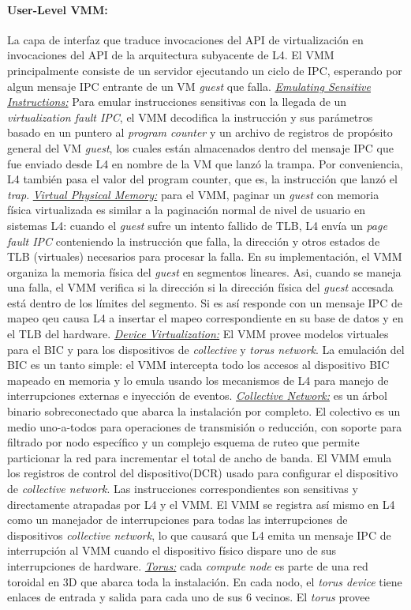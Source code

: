 \paragraph{\textnormal{\textbf{User-Level VMM:}}}
La capa de interfaz que traduce invocaciones del API de virtualización en invocaciones del API de la arquitectura subyacente de L4. El VMM principalmente consiste de un servidor ejecutando un ciclo de IPC, esperando por algun mensaje IPC entrante de un VM \emph{guest} que falla. \underline{\emph{Emulating Sensitive Instructions:}} Para emular instrucciones sensitivas con la llegada de un \emph{virtualization fault IPC}, el VMM decodifica la instrucción y sus parámetros basado en un puntero al \emph{program counter} y un archivo de registros de propósito general del VM \emph{guest}, los cuales están almacenados dentro del mensaje IPC que fue enviado desde L4 en nombre de la VM que lanzó la trampa. Por conveniencia, L4 también pasa el valor del program counter, que es, la instrucción que lanzó el \emph{trap}. \underline{\emph{Virtual Physical Memory:}} para el VMM, paginar un \emph{guest} con memoria física virtualizada es similar a la paginación normal de nivel de usuario en sistemas L4: cuando el \emph{guest} sufre un intento fallido de TLB, L4 envía un \emph{page fault IPC} conteniendo la instrucción que falla, la dirección y otros estados de TLB (virtuales) necesarios para procesar la falla. En su implementación, el VMM organiza la memoria física del \emph{guest} en segmentos lineares. Asi, cuando se maneja una falla, el VMM verifica  si la dirección si la dirección física del \emph{guest} accesada está dentro de los límites del segmento. Si es así responde con un mensaje IPC de mapeo qeu causa L4 a insertar el mapeo correspondiente en su base de datos y en el TLB del hardware. \underline{\emph{Device Virtualization:}} El VMM provee modelos virtuales para el BIC y para los dispositivos de \emph{collective} y \emph{torus network}. La emulación del BIC es un tanto simple: el VMM intercepta todo los accesos al dispositivo BIC mapeado en memoria y lo emula usando los mecanismos de L4 para manejo de interrupciones externas e inyección de eventos. \underline{\emph{Collective Network:}} es un árbol binario sobreconectado que abarca la instalación por completo. El colectivo es un medio uno-a-todos para operaciones de  transmisión o reducción, con soporte para filtrado por nodo específico y un complejo esquema de ruteo que permite particionar la red para incrementar el total de ancho de banda. El VMM emula los registros de control del dispositivo(DCR) usado para configurar el dispositivo de \emph{collective network}. Las instrucciones correspondientes son sensitivas y directamente atrapadas por L4 y el VMM. El VMM se registra así mismo en L4 como un manejador de interrupciones para todas las interrupciones de dispositivos \emph{collective network}, lo que causará que L4 emita un mensaje IPC de interrupción al VMM cuando el dispositivo físico dispare uno de sus interrupciones de hardware. \underline{\emph{Torus:}} cada \emph{compute node} es parte de una red toroidal en 3D que abarca toda la instalación. En cada nodo, el \emph{torus device} tiene enlaces de entrada y salida para cada uno de sus 6 vecinos. El \emph{torus} provee 